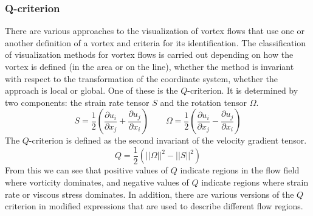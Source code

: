 \subsubsection{Q-criterion}
	There are various approaches to the visualization of vortex flows that use one or another definition of a vortex and criteria for its identification. The classification of visualization methods for vortex flows is carried out depending on how the vortex is defined (in the area or on the line), whether the method is invariant with respect to the transformation of the coordinate system, whether the approach is local or global\cite{Hunt1988}. One of these is the $Q$-criterion. It is determined by two components: the strain rate tensor $S$ and the rotation tensor $\Omega$.
	\begin{equation}
		S = \frac{1}{2}(\frac{\partial u_i}{\partial x_j} + \frac{\partial u_j}{\partial x_i}) \qquad \Omega = \frac{1}{2}(\frac{\partial u_i}{\partial x_j} - \frac{\partial u_j}{\partial x_i})
	\end{equation}
	The $Q$-criterion is defined as the second invariant of the velocity gradient tensor\cite{Wiebel2007}.
	\begin{equation}
		Q = \frac{1}{2}(||\Omega||^2 - ||S||^2)
	\end{equation}
	From this we can see that positive values of $Q$ indicate regions in the flow field where vorticity dominates, and negative values of $Q$ indicate regions where strain rate or viscous stress dominates. In addition, there are various versions of the $Q$ criterion in modified expressions that are used to describe different flow regions\cite{Berdahl1993,Chong1990}.
	
